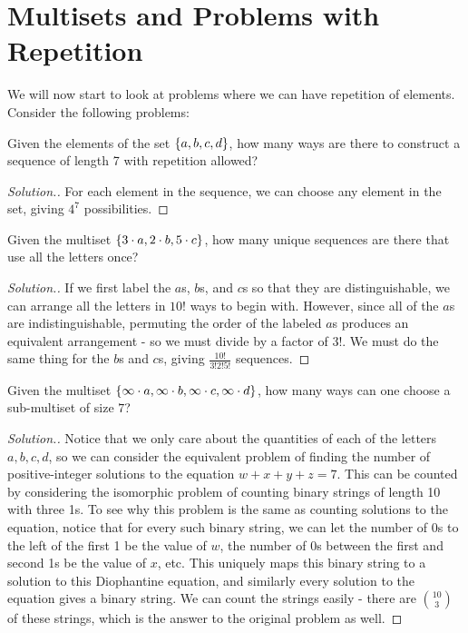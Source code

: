 \documentclass[11pt,twosided]{article}
\DeclarePairedDelimiter{\braces}{\{}{\}}
\newcommand{\set}{\braces}
\begin{document}
\section{Multisets and Problems with Repetition}
We will now start to look at problems where we can have repetition of elements. Consider the following problems: 
\begin{problem}{2}
Given the elements of the set $\set{ a, b, c, d }$, how many ways are there to construct a sequence of length 7 with repetition allowed?  
\end{problem}
\begin{proof}[Solution.]
For each element in the sequence, we can choose any element in the set, giving $\boxed{4^7}$ possibilities.
\end{proof}
\begin{problem}{3}
Given the multiset $\set{ 3\cdot a, 2\cdot b, 5 \cdot c }$, how many unique sequences are there that use all the letters once?
\end{problem}
\begin{proof}[Solution.]
If we first label the $a$s, $b$s, and $c$s so that they are distinguishable, we can arrange all the letters in $10!$ ways to begin with. However, since all of the $a$s are indistinguishable, permuting the order of the labeled $a$s produces an equivalent arrangement - so we must divide by a factor of $3!$. We must do the same thing for the $b$s and $c$s, giving $\boxed{\frac{10!}{3! 2! 5!}}$ sequences. 
\end{proof}
\begin{problem}{4}
Given the multiset $\set{ \infty \cdot a, \infty \cdot b, \infty \cdot c, \infty \cdot d }$, how many ways can one choose a sub-multiset of size $7$? 
\end{problem}
\begin{proof}[Solution.]
Notice that we only care about the quantities of each of the letters $a, b, c, d$, so we can consider the equivalent problem of finding the number of positive-integer solutions to the equation $w + x + y + z = 7$. This can be counted by considering the isomorphic problem of counting binary strings of length 10 with three 1s. To see why this problem is the same as counting solutions to the equation, notice that for every such binary string, we can let the number of $0$s to the left of the first 1 be the value of $w$, the number of $0$s between the first and second 1s be the value of $x$, etc. This uniquely maps this binary string to a solution to this Diophantine equation, and similarly every solution to the equation gives a binary string. We can count the strings easily - there are  $\boxed{\binom{10}{3}}$ of these strings, which is the answer to the original problem as well.
\end{proof}
\end{document}
